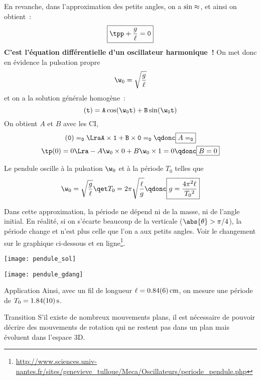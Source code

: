 \documentclass[../main/main.tex]{subfiles}
\begin{document}
En revanche, dans l'approximation des petits angles, on a $\sin\tt\approx\tt$,
et ainsi on obtient~:
\[\boxed{\tpp + \frac{g}{\ell}\tt = 0}\]
\textbf{C'est l'équation différentielle d'un oscillateur harmonique~!} On met
donc en évidence la pulsation propre
\[\w_0 = \sqrt{\frac{g}{\ell}}\]
et on a la solution générale homogène~:
\[\tt(t) = A\cos(\w_0t) + B\sin(\w_0t)\]
On obtient $A$ et $B$ avec les CI,
\begin{gather*}
    \tt(0) = \tt_0
    \Lra A\times 1 + B\times 0 = \tt_0
    \qdonc
    \boxed{A = \tt_0}\\
    \tp(0) = 0
    \Lra -A\w_0\times 0 + B\w_0\times 1 = 0
    \qdonc
    \boxed{B = 0}
\end{gather*}

Le pendule oscille à la pulsation $\w_0$ et à la période $T_0$ telles que
\[
    \w_0 = \sqrt{\frac{g}{\ell}}
    \qet
    T_0 = 2\pi \sqrt{\frac{\ell}{g}}
    \qdonc
    \boxed{g = \frac{4\pi^2\ell}{T_0{}^2}}
\]

Dans cette approximation, la période ne dépend ni de la masse, ni de l'angle
initial. En réalité, si on s'écarte beaucoup de la verticale ($\abs{\theta} >
\pi/4$), la période change et n'est plus celle que l'on a aux petits angles.
Voir le changement sur le graphique ci-dessous et en
ligne\footnote{\url{http://www.sciences.univ-nantes.fr/sites/genevieve_tulloue/Meca/Oscillateurs/periode_pendule.php}}.

\begin{minipage}{0.45\linewidth}
    \begin{center}
        \texttt{[image: pendule\_sol]}
    \end{center}
\end{minipage}
\hfill
\begin{minipage}{0.45\linewidth}
    \begin{center}
        \texttt{[image: pendule\_gdang]}
    \end{center}
\end{minipage}

\begin{rexem}{Application}
    Ainsi, avec un fil de longueur $\ell = \SI{0.84\pm0.06}{cm}$, on mesure une
    période de $T_0 = \SI{1.84\pm0.1}{s}$. \smallbreak
\end{rexem}

\begin{instruc}[trans]{Transition}
    S'il existe de nombreux mouvements plans, il est nécessaire de pouvoir
    décrire des mouvements de rotation qui ne restent pas dans un plan mais
    évoluent dans l'espace 3D.
\end{instruc}
\end{document}
